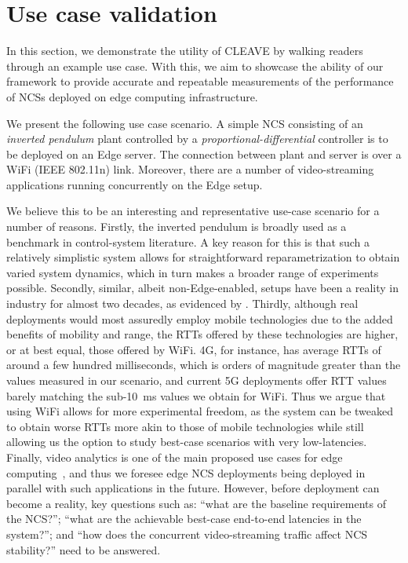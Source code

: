 \section{Use case validation}\label{sec:experiments}

In this section, we demonstrate the utility of \ac{CLEAVE} by walking readers through an example use case.
With this, we aim to showcase the ability of our framework to provide accurate and repeatable measurements of the performance of \acp{NCS} deployed on edge computing infrastructure.

We present the following use case scenario.
A simple \ac{NCS} consisting of an \emph{inverted pendulum} plant controlled by a \emph{proportional-differential} controller is to be deployed on an Edge server.
The connection between plant and server is over a WiFi (IEEE 802.11n) link.
Moreover, there are a number of video-streaming applications running concurrently on the Edge setup.

We believe this to be an interesting and representative use-case scenario for a number of reasons.
Firstly, the inverted pendulum is broadly used as a benchmark in control-system literature.
A key reason for this is that such a relatively simplistic system allows for straightforward reparametrization to obtain varied system dynamics, which in turn makes a broader range of experiments possible.
Secondly, similar, albeit non-Edge-enabled, setups have been a reality in industry for almost two decades, as evidenced by
.
Thirdly, although real deployments would most assuredly employ mobile technologies due to the added benefits of mobility and range, the \acp{RTT} offered by these technologies are higher, or at best equal, those offered by WiFi.
4G, for instance, has average \acp{RTT} of around a few hundred milliseconds, which is orders of magnitude greater than the values measured in our scenario, and current 5G deployments offer \ac{RTT} values barely matching the sub-\SI{10}{\milli\second} values we obtain for WiFi.
Thus we argue that using WiFi allows for more experimental freedom, as the system can be tweaked to obtain worse \acp{RTT} more akin to those of mobile technologies while still allowing us the option to study best-case scenarios with very low-latencies.
Finally, video analytics is one of the main proposed use cases for edge computing~\cite{Ananthanarayanan2017Analytics,Yi2017Analytics,Wang2018Analytics}, and thus we foresee edge \ac{NCS} deployments being deployed in parallel with such applications in the future.
However, before deployment can become a reality, key questions such as: 
``what are the baseline requirements of the \ac{NCS}?''; ``what are the achievable best-case end-to-end latencies in the system?''; and
``how does the concurrent video-streaming traffic affect \ac{NCS} stability?'' need to be answered.

